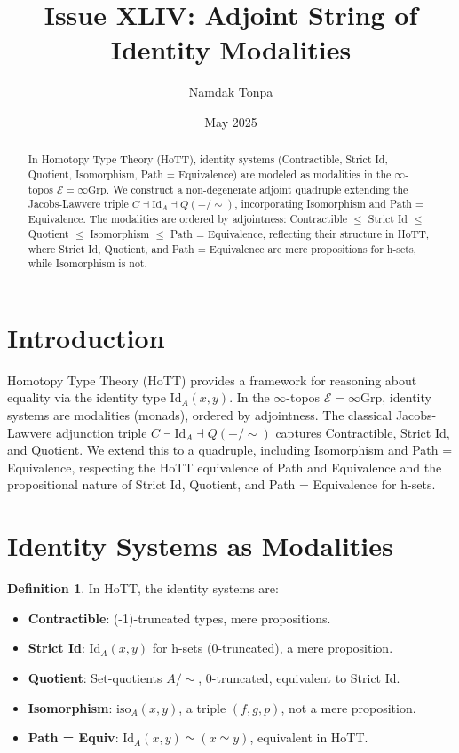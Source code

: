 \documentclass{article}
\theoremstyle{definition}
\newtheorem{definition}{Definition}
\begin{document}
\title{Issue XLIV: Adjoint String of Identity Modalities}
\author{Namdak Tonpa}
\date{May 2025}

\maketitle

\begin{abstract}
In Homotopy Type Theory (HoTT), identity systems (Contractible, Strict Id, Quotient, Isomorphism, Path = Equivalence) are modeled as modalities in the $\infty$-topos $\mathcal{E} = \infty\text{Grp}$. We construct a non-degenerate adjoint quadruple extending the Jacobs-Lawvere triple $C \dashv \text{Id}_A \dashv Q(-/\sim)$, incorporating Isomorphism and Path = Equivalence. The modalities are ordered by adjointness: Contractible $\leq$ Strict Id $\leq$ Quotient $\leq$ Isomorphism $\leq$ Path = Equivalence, reflecting their structure in HoTT, where Strict Id, Quotient, and Path = Equivalence are mere propositions for h-sets, while Isomorphism is not.
\end{abstract}

\section{Introduction}
Homotopy Type Theory (HoTT) provides a framework for reasoning about equality via the identity type $\text{Id}_A(x,y)$. In the $\infty$-topos $\mathcal{E} = \infty\text{Grp}$, identity systems are modalities (monads), ordered by adjointness. The classical Jacobs-Lawvere adjunction triple $C \dashv \text{Id}_A \dashv Q(-/\sim)$ captures Contractible, Strict Id, and Quotient. We extend this to a quadruple, including Isomorphism and Path = Equivalence, respecting the HoTT equivalence of Path and Equivalence and the propositional nature of Strict Id, Quotient, and Path = Equivalence for h-sets.

\section{Identity Systems as Modalities}
\begin{definition}
In HoTT, the identity systems are:
\begin{itemize}
    \item \textbf{Contractible}: (-1)-truncated types, mere propositions.
    \item \textbf{Strict Id}: $\text{Id}_A(x,y)$ for h-sets (0-truncated), a mere proposition.
    \item \textbf{Quotient}: Set-quotients $A / \sim$, 0-truncated, equivalent to Strict Id.
    \item \textbf{Isomorphism}: $\text{iso}_A(x,y)$, a triple $(f, g, p)$, not a mere proposition.
    \item \textbf{Path = Equiv}: $\text{Id}_A(x,y) \simeq (x \simeq y)$, equivalent in HoTT.
\end{itemize}
\end{definition}
\end{document}

